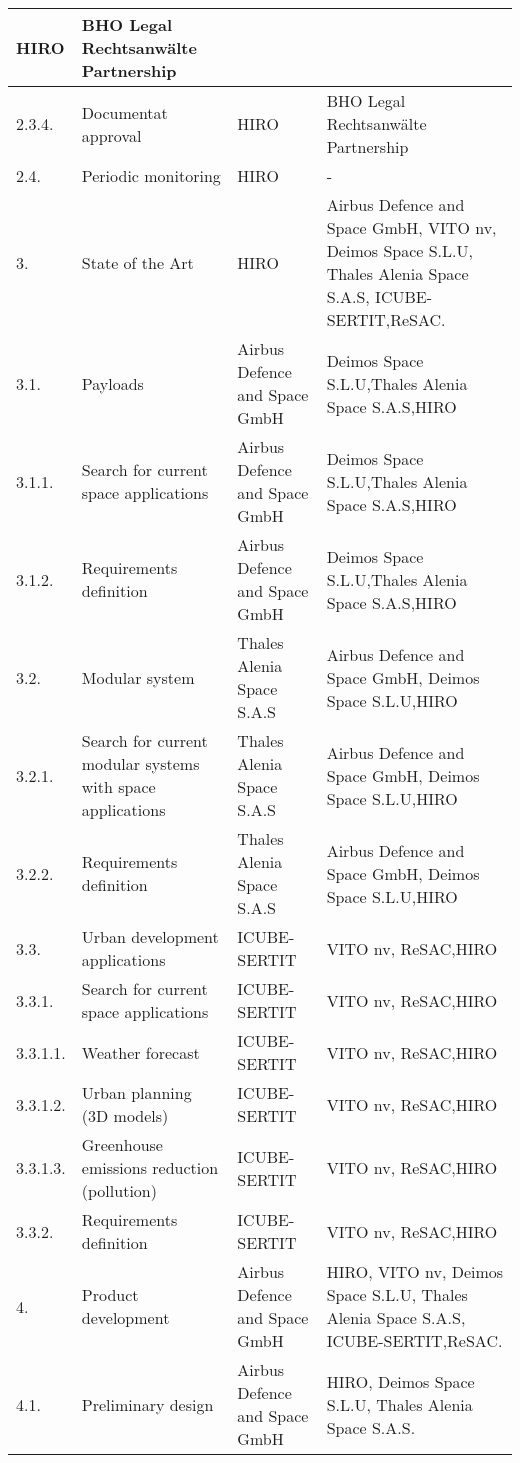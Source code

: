 \begin{longtable}[H]{l p{4cm} p{3.8cm} p{4cm}}
	HIRO&BHO Legal Rechtsanwälte Partnership
	\\ \midrule
	2.3.4. & Documentat approval &
	HIRO&BHO Legal Rechtsanwälte Partnership
	\\ \midrule
	2.4. & Periodic monitoring & HIRO&-
	\\ \midrule
	3. & State of the Art & HIRO& Airbus Defence and Space GmbH, VITO nv, Deimos Space S.L.U, Thales Alenia Space S.A.S, ICUBE-SERTIT,ReSAC.
	\\ \midrule
	3.1. & Payloads & Airbus Defence and Space GmbH&Deimos Space S.L.U,Thales Alenia Space S.A.S,HIRO
	\\ \midrule
	3.1.1. & Search for current space applications & Airbus Defence and Space GmbH&Deimos Space S.L.U,Thales Alenia Space S.A.S,HIRO
	\\ \midrule
	3.1.2. & Requirements definition & Airbus Defence and Space GmbH&Deimos Space S.L.U,Thales Alenia Space S.A.S,HIRO
	\\ \midrule
	3.2. & Modular system &Thales Alenia Space S.A.S&Airbus Defence and Space GmbH, Deimos Space S.L.U,HIRO
	\\ \midrule
	3.2.1. & Search for current modular systems with space applications&Thales Alenia Space S.A.S&Airbus Defence and Space GmbH, Deimos Space S.L.U,HIRO
	\\ \midrule
	3.2.2. & Requirements definition&Thales Alenia Space S.A.S&Airbus Defence and Space GmbH, Deimos Space S.L.U,HIRO
	\\ \midrule
	3.3. & Urban development applications &ICUBE-SERTIT&VITO nv, ReSAC,HIRO
	\\ \midrule
	3.3.1. & Search for current space applications &ICUBE-SERTIT&VITO nv, ReSAC,HIRO
	\\ \midrule
	3.3.1.1. & Weather forecast &ICUBE-SERTIT&VITO nv, ReSAC,HIRO
	\\ \midrule
	3.3.1.2. & Urban planning (3D models) &ICUBE-SERTIT&VITO nv, ReSAC,HIRO
	\\ \midrule
	3.3.1.3. & Greenhouse emissions reduction (pollution) &ICUBE-SERTIT&VITO nv, ReSAC,HIRO
	\\ \midrule
	3.3.2. & Requirements definition &ICUBE-SERTIT&VITO nv, ReSAC,HIRO
	\\ \midrule
	4. & Product development &Airbus Defence and Space GmbH& HIRO, VITO nv, Deimos Space S.L.U, Thales Alenia Space S.A.S, ICUBE-SERTIT,ReSAC.
	\\ \midrule
	4.1. & Preliminary design &
	Airbus Defence and Space GmbH& HIRO, Deimos Space S.L.U, Thales Alenia Space S.A.S.

\end{longtable}
